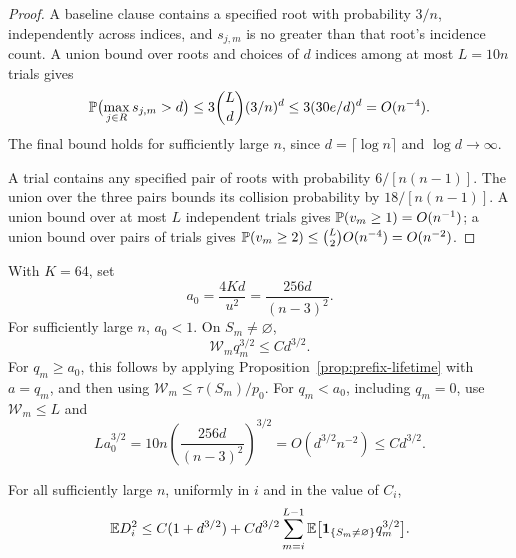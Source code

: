\begin{proof}
A baseline clause contains a specified root with probability \(3/n\),
independently across indices, and \(s_{j,m}\) is no greater than that
root's incidence count.  A union bound over roots and choices of \(d\)
indices among at most \(L=10n\) trials gives
\begin{equation}\label{eq:prefix-count-numerical}
 \mathbb P\bigl(\max_{j\in R}s_{j,m}>d\bigr)
 \le3\binom Ld(3/n)^d\le3(30e/d)^d=O(n^{-4}).
\end{equation}
The final bound holds for sufficiently large \(n\), since
\(d=\lceil\log n\rceil\) and \(\log d\to\infty\).

A trial contains any specified pair of roots with probability
\(6/[n(n-1)]\).  The union over the three pairs bounds its collision
probability by \(18/[n(n-1)]\).  A union bound over at most \(L\)
independent trials gives \(\mathbb P(v_m\ge1)=O(n^{-1})\); a union bound
over pairs of trials gives
\(\mathbb P(v_m\ge2)\le\binom L2 O(n^{-4})=O(n^{-2})\).
\end{proof}

With \(K=64\), set
\begin{equation}\label{eq:prefix-cutoff}
 a_0=\frac{4Kd}{u^2}=\frac{256d}{(n-3)^2}.
\end{equation}
For sufficiently large \(n\), \(a_0<1\).  On \(S_m\ne\varnothing\),
\begin{equation}\label{eq:prefix-weighted-lifetime}
 \mathcal W_m q_m^{3/2}\le C d^{3/2}.
\end{equation}
For \(q_m\ge a_0\), this follows by applying
Proposition~\ref{prop:prefix-lifetime} with \(a=q_m\), and then using
\(\mathcal W_m\le\tau(S_m)/p_0\).  For \(q_m<a_0\), including
\(q_m=0\), use \(\mathcal W_m\le L\) and
\begin{equation}\label{eq:prefix-small-level}
 L a_0^{3/2}
 =10n\left(\frac{256d}{(n-3)^2}\right)^{3/2}
 =O(d^{3/2}n^{-2})\le C d^{3/2}.
\end{equation}

\begin{lemma}\label{lem:prefix-reduction}
For all sufficiently large \(n\), uniformly in \(i\) and in the value
of \(C_i\),
\begin{equation}\label{eq:prefix-reduction}
 \mathbb E D_i^2\le C(1+d^{3/2})+
 C d^{3/2}\sum_{m=i}^{L-1}
       \mathbb E\bigl[\mathbf 1_{\{S_m\ne\varnothing\}}q_m^{3/2}\bigr].
\end{equation}
\end{lemma}

